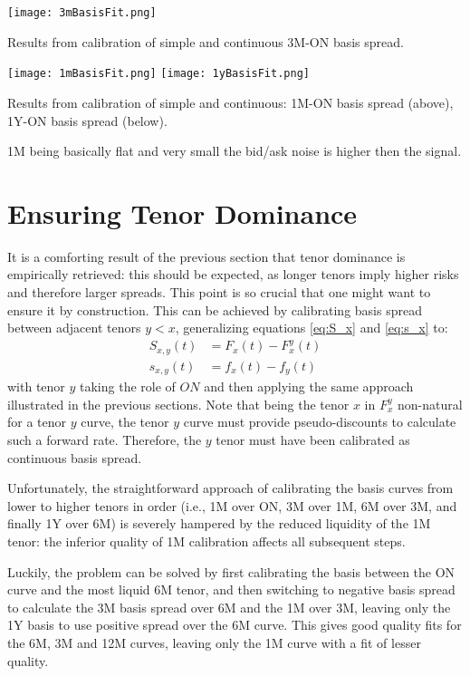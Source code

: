 \documentclass{article}
\begin{document}
\begin{table}[p]
\centering
\texttt{[image: 3mBasisFit.png]}
\caption{Results from calibration of simple and continuous 3M-ON basis spread.}
\label{3mBasisFit}
\end{table}

\begin{table}[p]
\centering
\texttt{[image: 1mBasisFit.png]}\vfill
\texttt{[image: 1yBasisFit.png]}
\caption{Results from calibration of simple and continuous: 1M-ON basis spread (above), 1Y-ON basis spread (below).}
\label{1mBasisFit}
\end{table}

1M being basically flat and very small the bid/ask noise is higher then the signal.

\section{Ensuring Tenor Dominance}
\label{sec:ensuring-tenor-dominance}

It is a comforting result of the previous section that tenor dominance is empirically retrieved: this should be expected, as longer tenors imply higher risks and therefore larger spreads. This point is so crucial that one might want to ensure it by construction. This can be achieved by calibrating basis spread between adjacent tenors $y<x$, generalizing equations \ref{eq:S_x} and \ref{eq:s_x} to:
\begin{equation}
\begin{split}
S_{x,y}(t) &= F_x(t) - F_x^{y}(t)\\
s_{x,y}(t) &= f_x(t) - f_{y}(t)
\end{split}
\end{equation}
with tenor $y$ taking the role of $ON$ and then applying the same approach illustrated in the previous sections.
Note that being the tenor $x$ in $F_x^{y}$ non-natural for a tenor $y$ curve, the tenor $y$ curve must provide pseudo-discounts to calculate such a forward rate. Therefore, the $y$ tenor must have been calibrated as continuous basis spread.

Unfortunately, the straightforward approach of calibrating the basis curves from lower to higher tenors in order (i.e., 1M over ON, 3M over 1M, 6M over 3M, and finally 1Y over 6M) is severely hampered by the reduced liquidity of the 1M tenor: the inferior quality of 1M calibration affects all subsequent steps.

Luckily, the problem can be solved by first calibrating the basis between the ON curve and the most liquid 6M tenor, and then switching to negative basis spread to calculate the 3M basis spread over 6M and the 1M over 3M, leaving only the 1Y basis to use positive spread over the 6M curve.  This gives good quality fits for the 6M, 3M and 12M curves, leaving only the 1M curve with a fit of lesser quality.
\end{document}
